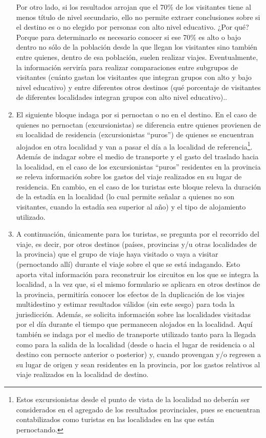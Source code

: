 \documentclass[
]{book}
\begin{document}
\begin{enumerate}
{    Por otro lado, si los resultados arrojan que el 70\% de los visitantes tiene al menos título de nivel secundario, ello no permite extraer conclusiones sobre si el destino es o no elegido por personas con alto nivel educativo. ¿Por qué? Porque para determinarlo es necesario conocer si ese 70\% es alto o bajo dentro no sólo de la población desde la que llegan los visitantes sino también entre quienes, dentro de esa población, suelen realizar viajes. Eventualmente, la información serviría para realizar comparaciones entre subgrupos de visitantes (cuánto gastan los visitantes que integran grupos con alto y bajo nivel educativo) y entre diferentes otros destinos (qué porcentaje de visitantes de diferentes localidades integran grupos con alto nivel educativo).}.
\item
  El siguiente bloque indaga por si pernoctan o no en el destino. En el caso de quienes no pernoctan (excursionistas) se diferencia entre quienes provienen de su localidad de residencia (excursionistas ``puros'') de quienes se encuentran alojados en otra localidad y van a pasar el día a la localidad de referencia\footnote{Estos excursionistas desde el punto de vista de la localidad no deberán ser considerados en el agregado de los resultados provinciales, pues se encuentran contabilizados como turistas en las localidades en las que están pernoctando.}. Además de indagar sobre el medio de transporte y el gasto del traslado hacia la localidad, en el caso de los excursionistas ``puros'' residentes en la provincia se releva información sobre los gastos del viaje realizados en su lugar de residencia. En cambio, en el caso de los turistas este bloque releva la duración de la estadía en la localidad (lo cual permite señalar a quienes no son visitantes, cuando la estadía sea superior al año) y el tipo de alojamiento utilizado.
\item
  A continuación, únicamente para los turistas, se pregunta por el recorrido del viaje, es decir, por otros destinos (países, provincias y/u otras localidades de la provincia) que el grupo de viaje haya visitado o vaya a visitar (pernoctando allí) durante el viaje sobre el que se está indagando. Esto aporta vital información para reconstruir los circuitos en los que se integra la localidad, a la vez que, si el mismo formulario se aplicara en otros destinos de la provincia, permitiría conocer los efectos de la duplicación de los viajes multidestino y estimar resultados válidos (sin este sesgo) para toda la jurisdicción. Además, se solicita información sobre las localidades visitadas por el día durante el tiempo que permanecen alojados en la localidad. Aquí también se indaga por el medio de transporte utilizado tanto para la llegada como para la salida de la localidad (desde o hacia el lugar de residencia o al destino con pernocte anterior o posterior) y, cuando provengan y/o regresen a su lugar de origen y sean residentes en la provincia, por los gastos relativos al viaje realizados en la localidad de destino.

\end{enumerate}
\end{document}
